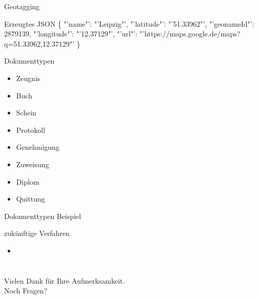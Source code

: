 \documentclass[12pt]{beamer}
\begin{document}
\begin{large}
\begin{frame}{Geotagging}
 \vspace*{\fill}
 \begin{block}{Erzeugtes JSON}
 \normalsize \{
 \newline
 \hspace*{0.5cm}"'name"': "'Leipzig"',
 \newline
 \hspace*{0.5cm}"'latitude"': "'51.33962"',
 \newline
 \hspace*{0.5cm}"'geonameId"': 2879139,
 \newline
 \hspace*{0.5cm}"'longitude"': "'12.37129"',
 \newline
 \hspace*{0.5cm}"'url"': "'https://maps.google.de/maps?q=51.33962,12.37129"'
 \newline
 \}
 \end{block}
\end{frame}
 
\begin{frame}{Dokumenttypen}
 \begin{itemize}
  \item Zeugnis
  \item Buch
  \item Schein
  \item Protokoll
  \item Genehmigung
  \item Zuweisung
  \item Diplom
  \item Quittung
 \end{itemize}
\end{frame}

\begin{frame}{Dokumenttypen Beispiel}

\end{frame}


\begin{frame}{zukünftige Verfahren}
 \begin{itemize}
   \item 
 \end{itemize}
\end{frame}


\section*{}
\begin{frame}
\centering
{\Large Vielen Dank für Ihre Aufmerksamkeit. \\ Noch Fragen?}
\end{frame}

\end{large}
\end{document}

